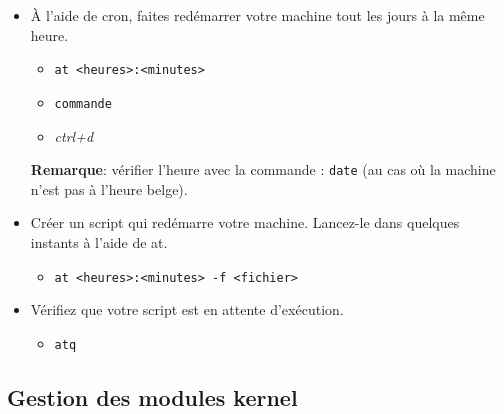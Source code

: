 \documentclass[a4paper]{article}
\begin{document}
\begin{itemize}
\item À l'aide de cron, faites redémarrer votre machine tout les jours à la même heure.
\begin{example}
    \begin{itemize}
        \item \texttt{at <heures>:<minutes>}
        \item \texttt{commande}
        \item \textit{ctrl+d}
    \end{itemize}
    \textbf{Remarque}: vérifier l'heure avec la commande : \texttt{date} (au cas où la machine n'est pas à l'heure belge).
\end{example}

\item Créer un script qui redémarre votre machine. Lancez-le dans quelques instants à l'aide de at.
\begin{example}
    \begin{itemize}
        \item \texttt{at <heures>:<minutes> -f <fichier>}
    \end{itemize}
\end{example}

\item Vérifiez que votre script est en attente d'exécution.
\begin{example}
    \begin{itemize}
        \item \texttt{atq}
    \end{itemize}
\end{example}

\end{itemize}










\subsection{Gestion des modules kernel}
\end{document}
